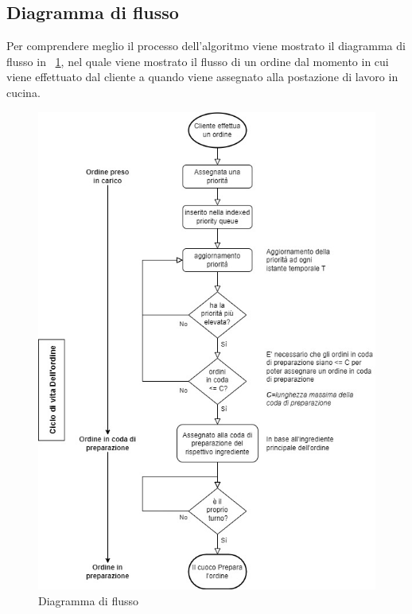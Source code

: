 \subsection{Diagramma di flusso}
Per comprendere meglio il processo dell’algoritmo viene mostrato il diagramma di flusso in \figurename~\ref{fig:flowchart}, nel quale viene mostrato il flusso di un ordine dal momento in cui viene effettuato dal cliente a quando viene assegnato alla postazione di lavoro in cucina.
\begin{figure}[htbp]
	\centering
	\includegraphics[scale=0.6]{iterazione2/images/flowchart.jpg}
	\caption{Diagramma di flusso\label{fig:flowchart}}
\end{figure}

\clearpage